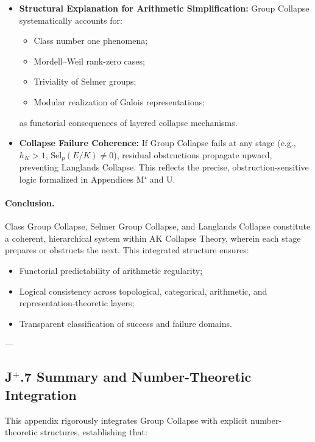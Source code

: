 \documentclass[11pt]{article}
\begin{document}
\begin{itemize}
    \item \textbf{Structural Explanation for Arithmetic Simplification:}  
    Group Collapse systematically accounts for:
    \begin{itemize}
        \item Class number one phenomena;
        \item Mordell--Weil rank-zero cases;
        \item Triviality of Selmer groups;
        \item Modular realization of Galois representations;
    \end{itemize}
    as functorial consequences of layered collapse mechanisms.

    \item \textbf{Collapse Failure Coherence:}  
    If Group Collapse fails at any stage (e.g., \( h_K > 1 \), \( \mathrm{Sel}_p(E/K) \neq 0 \)), residual obstructions propagate upward, preventing Langlands Collapse. This reflects the precise, obstruction-sensitive logic formalized in Appendices M⁺ and U.

\end{itemize}

\paragraph{Conclusion.}  
Class Group Collapse, Selmer Group Collapse, and Langlands Collapse constitute a coherent, hierarchical system within AK Collapse Theory, wherein each stage prepares or obstructs the next. This integrated structure ensures:

\begin{itemize}
    \item Functorial predictability of arithmetic regularity;
    \item Logical consistency across topological, categorical, arithmetic, and representation-theoretic layers;
    \item Transparent classification of success and failure domains.
\end{itemize}

---

\subsection*{J$^{+}$.7 Summary and Number-Theoretic Integration}

This appendix rigorously integrates Group Collapse with explicit number-theoretic structures, establishing that:
\end{document}
